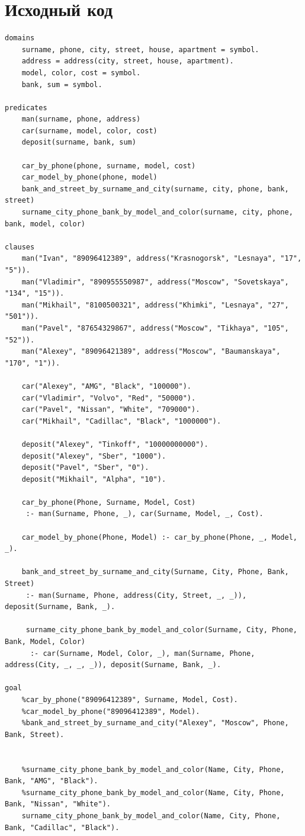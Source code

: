\documentclass[12pt]{report}
\begin{document}
\section*{Исходный код}
\begin{lstlisting}
domains
	surname, phone, city, street, house, apartment = symbol.
	address = address(city, street, house, apartment).
	model, color, cost = symbol.
	bank, sum = symbol.
   
predicates
	man(surname, phone, address)
	car(surname, model, color, cost)
	deposit(surname, bank, sum)
	
	car_by_phone(phone, surname, model, cost)
	car_model_by_phone(phone, model)
	bank_and_street_by_surname_and_city(surname, city, phone, bank, street)
	surname_city_phone_bank_by_model_and_color(surname, city, phone, bank, model, color)
   
clauses 
	man("Ivan", "89096412389", address("Krasnogorsk", "Lesnaya", "17", "5")).
	man("Vladimir", "890955550987", address("Moscow", "Sovetskaya", "134", "15")).
	man("Mikhail", "8100500321", address("Khimki", "Lesnaya", "27", "501")).
	man("Pavel", "87654329867", address("Moscow", "Tikhaya", "105", "52")).
	man("Alexey", "89096421389", address("Moscow", "Baumanskaya", "170", "1")).
	
	car("Alexey", "AMG", "Black", "100000").
	car("Vladimir", "Volvo", "Red", "50000").
	car("Pavel", "Nissan", "White", "709000").
	car("Mikhail", "Cadillac", "Black", "1000000").
	
	deposit("Alexey", "Tinkoff", "10000000000").
	deposit("Alexey", "Sber", "1000").
	deposit("Pavel", "Sber", "0").
	deposit("Mikhail", "Alpha", "10").
	
	car_by_phone(Phone, Surname, Model, Cost)
	 :- man(Surname, Phone, _), car(Surname, Model, _, Cost).
	
	car_model_by_phone(Phone, Model) :- car_by_phone(Phone, _, Model, _).
	
	bank_and_street_by_surname_and_city(Surname, City, Phone, Bank, Street)
	 :- man(Surname, Phone, address(City, Street, _, _)), deposit(Surname, Bank, _).
	 
	 surname_city_phone_bank_by_model_and_color(Surname, City, Phone, Bank, Model, Color)
	  :- car(Surname, Model, Color, _), man(Surname, Phone, address(City, _, _, _)), deposit(Surname, Bank, _).
   
goal
	%car_by_phone("89096412389", Surname, Model, Cost).
	%car_model_by_phone("89096412389", Model).
	%bank_and_street_by_surname_and_city("Alexey", "Moscow", Phone, Bank, Street).
	
	
	%surname_city_phone_bank_by_model_and_color(Name, City, Phone, Bank, "AMG", "Black").
	%surname_city_phone_bank_by_model_and_color(Name, City, Phone, Bank, "Nissan", "White").
	surname_city_phone_bank_by_model_and_color(Name, City, Phone, Bank, "Cadillac", "Black").
\end{lstlisting}
\end{document}
